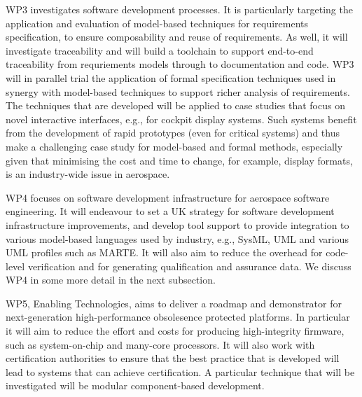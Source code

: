 WP3 investigates software development processes. It is particularly targeting the application and evaluation of model-based techniques for requirements
specification, to ensure composability and reuse of requirements. As well, it will investigate traceability and will build a toolchain to support end-to-end
traceability from requriements models through to documentation and code. WP3 will in parallel trial the application of formal specification techniques used in
synergy with model-based techniques to support richer analysis of requirements. The techniques that are developed will be applied to case studies that
focus on novel interactive interfaces, e.g., for cockpit display systems. Such systems benefit from the development of rapid prototypes (even for critical
systems) and thus make a challenging case study for model-based and formal methods, especially given that minimising the cost and time to change,
for example, display formats, is an industry-wide issue in aerospace.

WP4 focuses on software development infrastructure for aerospace software engineering. It will endeavour to set a UK strategy for software development
infrastructure improvements, and  develop tool support to provide integration to various model-based languages used by industry, e.g., SysML, UML and
various UML profiles such as MARTE. It will also aim to reduce the overhead for code-level verification and for generating qualification and assurance data.
We discuss WP4 in some more detail in the next subsection.

WP5, Enabling Technologies, aims to deliver a roadmap and demonstrator for next-generation high-performance obsolesence protected platforms. In particular
it will aim to reduce the effort and costs for producing high-integrity firmware, such as system-on-chip and many-core processors. It will also work with certification
authorities to ensure that the best practice that is developed will lead to systems that can achieve certification. A particular technique that will be investigated will
be modular component-based development.

